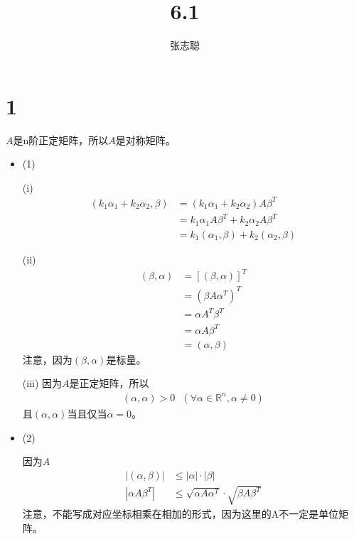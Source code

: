 \documentclass{article}
\begin{document}
\title{6.1}
\author{张志聪}
\maketitle

\section*{1}

$A$是n阶正定矩阵，所以$A$是对称矩阵。

\begin{itemize}
  \item (1)

        (i)
        \begin{align*}
          (k_1 \alpha_1 + k_2 \alpha_2, \beta)
           & = (k_1 \alpha_1 + k_2 \alpha_2) A \beta^T         \\
           & = k_1 \alpha_1 A \beta^T + k_2 \alpha_2 A \beta^T \\
           & = k_1(\alpha_1, \beta) + k_2(\alpha_2, \beta)
        \end{align*}

        (ii)
        \begin{align*}
          (\beta, \alpha) & = [(\beta, \alpha)]^T  \\
                          & = (\beta A \alpha^T)^T \\
                          & = \alpha A^T \beta^T   \\
                          & = \alpha A \beta^T     \\
                          & = (\alpha, \beta)
        \end{align*}
        注意，因为$(\beta, \alpha)$是标量。

        (iii) 因为$A$是正定矩阵，所以
        \begin{align*}
          (\alpha, \alpha) > 0 \ \ \ (\forall \alpha \in \mathbb{R}^n, \alpha \neq 0)
        \end{align*}
        且$(\alpha, \alpha)$当且仅当$\alpha = 0$。

  \item (2)

        因为$A$
        \begin{align*}
          |(\alpha, \beta)|  & \leq |\alpha| \cdot |\beta|                                \\
          |\alpha A \beta^T| & \leq \sqrt{\alpha A \alpha^T} \cdot \sqrt{\beta A \beta^T}
        \end{align*}
        注意，不能写成对应坐标相乘在相加的形式，因为这里的A不一定是单位矩阵。
\end{itemize}
\end{document}
